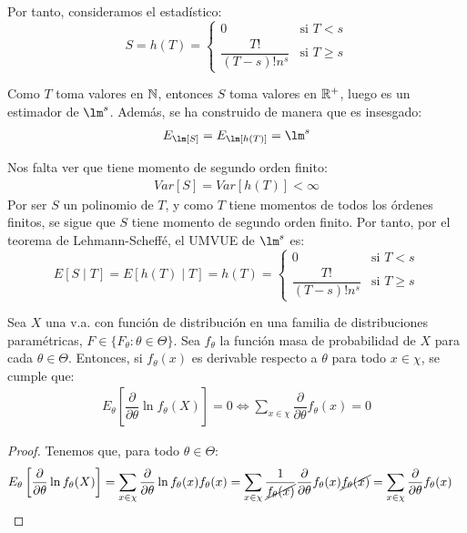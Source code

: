 \begin{ejercicio}
    Por tanto, consideramos el estadístico:
    \begin{equation*}
        S = h(T) = \begin{cases}
            0 & \text{si } T < s \\
            \dfrac{T!}{(T-s)! n^s} & \text{si } T \geq s
        \end{cases}
    \end{equation*}

    Como $T$ toma valores en $\mathbb{N}$, entonces $S$ toma valores en $\mathbb{R}^+$, luego es un estimador de $\lm^s$. Además, se ha construido de manera que es insesgado:
    \begin{align*}
        E_\lm[S] = E_\lm[h(T)] = \lm^s
    \end{align*}

    Nos falta ver que tiene momento de segundo orden finito:
    \begin{align*}
        Var[S] = Var[h(T)] < \infty
    \end{align*}
    Por ser $S$ un polinomio de $T$, y como $T$ tiene momentos de todos los órdenes finitos, se sigue que $S$ tiene momento de segundo orden finito. Por tanto, por el teorema de Lehmann-Scheffé, el UMVUE de $\lm^s$ es:
    \begin{equation*}
        E[S \mid T] = E[h(T) \mid T] = h(T) = \begin{cases}
            0 & \text{si } T < s \\
            \dfrac{T!}{(T-s)! n^s} & \text{si } T \geq s
        \end{cases}
    \end{equation*}
\end{ejercicio}

\begin{lema}
    Sea $X$ una v.a. con función de distribución en una familia de distribuciones paramétricas, $F \in \{F_\theta : \theta \in \Theta\}$. Sea $f_\theta$ la función masa de probabilidad de $X$ para cada $\theta \in \Theta$. Entonces, si $f_\theta(x)$ es derivable respecto a $\theta$ para todo $x \in \chi$, se cumple que:
    \begin{align*}
        E_\theta\left[\dfrac{\partial}{\partial\theta} \ln f_\theta(X)\right] = 0
        \iff
        \sum_{x \in \chi} \dfrac{\partial}{\partial\theta} f_\theta(x) = 0
    \end{align*}

    \begin{proof}
        Tenemos que, para todo $\theta \in \Theta$:
        \begin{align*}
            E_\theta\left[\dfrac{\partial}{\partial\theta} \ln f_\theta(X)\right]
            &= \sum_{x \in \chi} \dfrac{\partial}{\partial\theta} \ln f_\theta(x) f_\theta(x)
            = \sum_{x \in \chi} \dfrac{1}{\cancel{f_\theta(x)}} \dfrac{\partial}{\partial\theta} f_\theta(x) \cancel{f_\theta(x)}
            = \sum_{x \in \chi} \dfrac{\partial}{\partial\theta} f_\theta(x)
        \end{align*}
    \end{proof}
\end{lema}

